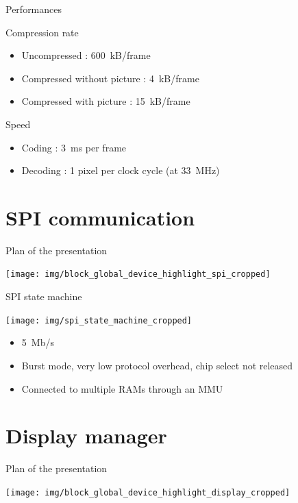 \documentclass[10pt, notes]{beamer}
\begin{document}
\begin{frame}{Performances}
    \begin{block}{Compression rate}
        \begin{itemize}
            \item Uncompressed : \SI{600}{kB/frame}
            \item Compressed without picture : \SI{4}{kB/frame}
            \item Compressed with picture : \SI{15}{kB/frame} 
        \end{itemize}
    \end{block}
        
    \begin{block}{Speed}
        \begin{itemize}
            \item Coding : \SI{3}{ms} per frame
            \item Decoding : 1 pixel per clock cycle (at \SI{33}{\mega\hertz})
        \end{itemize}
    \end{block}
\end{frame}

\section{SPI communication}
\begin{frame}{Plan of the presentation}
    \begin{center}
        \texttt{[image: img/block\_global\_device\_highlight\_spi\_cropped]}
    \end{center}
\end{frame}

\begin{frame}{SPI state machine}
    \begin{center}
        \texttt{[image: img/spi\_state\_machine\_cropped]}
    \end{center}

    \begin{itemize}
        \item \SI{5}{Mb/s}
        \item Burst mode, very low protocol overhead, chip select not released
        \item Connected to multiple RAMs through an MMU
    \end{itemize}
\end{frame}

\section{Display manager}
\begin{frame}{Plan of the presentation}
    \begin{center}
        \texttt{[image: img/block\_global\_device\_highlight\_display\_cropped]}
    \end{center}
\end{frame}
\end{document}
